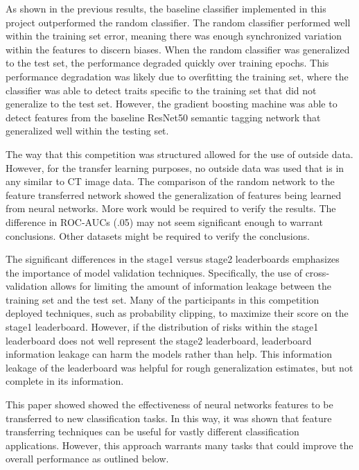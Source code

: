 \documentclass[conference,11pt]{IEEEtran}
\begin{document}
As shown in the previous results, the baseline classifier implemented in this project outperformed the random classifier. The random classifier performed well within the training set error, meaning there was enough synchronized variation within the features to discern biases. When the random classifier was generalized to the test set, the performance degraded quickly over training epochs. This performance degradation was likely due to overfitting the training set, where the classifier was able to detect traits specific to the training set that did not generalize to the test set. However, the gradient boosting machine was able to detect features from the baseline ResNet50 semantic tagging network that generalized well within the testing set.

The way that this competition was structured allowed for the use of outside data. However, for the transfer learning purposes, no outside data was used that is in any similar to CT image data. The comparison of the random network to the feature transferred network showed the generalization of features being learned from neural networks. More work would be required to verify the results. The difference in ROC-AUCs (.05) may not seem significant enough to warrant conclusions. Other datasets might be required to verify the conclusions.

The significant differences in the stage1 versus stage2 leaderboards emphasizes the importance of model validation techniques. Specifically, the use of cross-validation allows for limiting the amount of information leakage between the training set and the test set. Many of the participants in this competition deployed techniques, such as probability clipping, to maximize their score on the stage1 leaderboard. However, if the distribution of risks within the stage1 leaderboard does not well represent the stage2 leaderboard, leaderboard information leakage can harm the models rather than help. This information leakage of the leaderboard was helpful for rough generalization estimates, but not complete in its information.

This paper showed showed the effectiveness of neural networks features to be transferred to new classification tasks. In this way, it was shown that feature transferring techniques can be useful for vastly different classification applications. However, this approach warrants many tasks that could improve the overall performance as outlined below.
\end{document}
